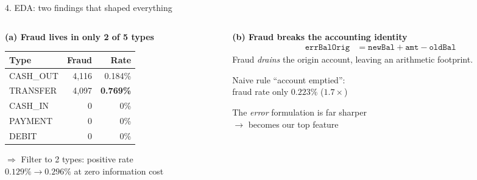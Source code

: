 \documentclass[aspectratio=169]{beamer}
\newcommand{\good}[1]{\textcolor{good}{\textbf{#1}}}
\begin{document}
\begin{frame}{4. EDA: two findings that shaped everything}
\begin{columns}[T]
\begin{column}{0.5\textwidth}
\textbf{(a) Fraud lives in only 2 of 5 types}
\begin{table}
\scriptsize
\begin{tabular}{lrr}
\toprule
Type & Fraud & Rate \\
\midrule
CASH\_OUT & 4{,}116 & 0.184\% \\
TRANSFER  & 4{,}097 & \good{0.769\%} \\
CASH\_IN  & 0 & 0\% \\
PAYMENT   & 0 & 0\% \\
DEBIT     & 0 & 0\% \\
\bottomrule
\end{tabular}
\end{table}
$\Rightarrow$ Filter to 2 types: positive rate\\
\good{$0.129\% \to 0.296\%$} at zero information cost
\end{column}
\begin{column}{0.5\textwidth}
\textbf{(b) Fraud breaks the accounting identity}
\begin{align*}
\texttt{errBalOrig} &= \texttt{newBal} + \texttt{amt} - \texttt{oldBal}
\end{align*}
Fraud \emph{drains} the origin account, leaving an arithmetic footprint.

\vspace{0.5em}
Naive rule ``account emptied'':\\
fraud rate only $0.223\%$ ($1.7\times$)

\vspace{0.3em}
\alert{The \emph{error} formulation is far sharper}\\
$\to$ becomes our top feature
\end{column}
\end{columns}
\end{frame}
\end{document}
